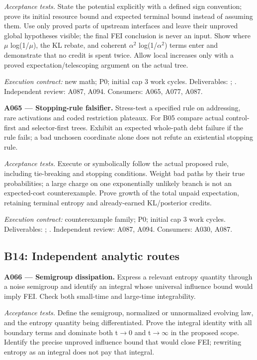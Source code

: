 \documentclass[11pt]{article}
\begin{document}
\emph{Acceptance tests.} State the potential explicitly with a defined sign convention; prove its initial resource bound and expected terminal bound instead of assuming them. Use only proved parts of upstream interfaces and leave their unproved global hypotheses visible; the final FEI conclusion is never an input. Show where $\mu$ log(1/$\mu$), the KL rebate, and coherent $\alpha$$^2$ log(1/$\alpha$$^2$) terms enter and demonstrate that no credit is spent twice. Allow local increases only with a proved expectation/telescoping argument on the actual tree.

{\small\emph{Execution contract:} new math; P0; initial cap 3 work cycles. Deliverables: ; . Independent review: A087, A094. Consumers: A065, A077, A087.}

\textbf{A065 --- Stopping-rule falsifier.} Stress-test a specified rule on addressing, rare activations and coded restriction plateaux. For B05 compare actual control-first and selector-first trees. Exhibit an expected whole-path debt failure if the rule fails; a bad unchosen coordinate alone does not refute an existential stopping rule.

\emph{Acceptance tests.} Execute or symbolically follow the actual proposed rule, including tie-breaking and stopping conditions. Weight bad paths by their true probabilities; a large charge on one exponentially unlikely branch is not an expected-cost counterexample. Prove growth of the total unpaid expectation, retaining terminal entropy and already-earned KL/posterior credits.

{\small\emph{Execution contract:} counterexample family; P0; initial cap 3 work cycles. Deliverables: ; . Independent review: A087, A094. Consumers: A030, A087.}

\subsection{B14: Independent analytic routes}

\textbf{A066 --- Semigroup dissipation.} Express a relevant entropy quantity through a noise semigroup and identify an integral whose universal influence bound would imply FEI. Check both small-time and large-time integrability.

\emph{Acceptance tests.} Define the semigroup, normalized or unnormalized evolving law, and the entropy quantity being differentiated. Prove the integral identity with all boundary terms and dominate both t$\to$0 and t$\to$$\infty$ in the proposed scope. Identify the precise unproved influence bound that would close FEI; rewriting entropy as an integral does not pay that integral.
\end{document}
